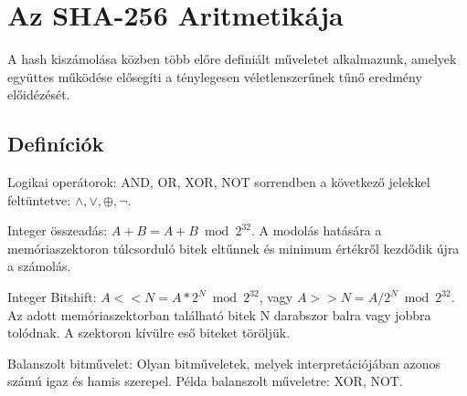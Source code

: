\section{Az SHA-256 Aritmetikája}

A hash kiszámolása közben több előre definiált műveletet alkalmazunk, amelyek együttes működése elősegíti a ténylegesen véletlenszerűnek tűnő eredmény előidézését.



\subsection{Definíciók}


\begin{definition}
Logikai operátorok: AND, OR, XOR, NOT sorrendben a következő jelekkel feltüntetve: $\land, \lor, \oplus, \neg$.
\end{definition}

\begin{definition}
Integer összeadás: $A + B = A + B \bmod 2^{32} $. A modolás hatására a memóriaszektoron túlcsorduló bitek eltűnnek és minimum értékről kezdődik újra a számolás.
\end{definition}

\begin{definition}
Integer Bitshift: $A << N = A * 2^{N} \bmod 2^{32}$, vagy $A >> N = A / 2^{N} \bmod 2^{32}$. Az adott memóriaszektorban található bitek N darabszor balra vagy jobbra tolódnak. A szektoron kívülre eső biteket töröljük.
\end{definition}

\begin{definition}
Balanszolt bitművelet: Olyan bitműveletek, melyek interpretációjában azonos számú igaz és hamis szerepel. Példa balanszolt műveletre: XOR, NOT.
\end{definition}


